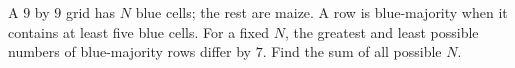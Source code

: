 A $9$ by $9$ grid has $N$ blue cells; the rest are maize. A row is blue-majority when it contains at least five blue cells. For a fixed $N$, the greatest and least possible numbers of blue-majority rows differ by $7$. Find the sum of all possible $N$.
